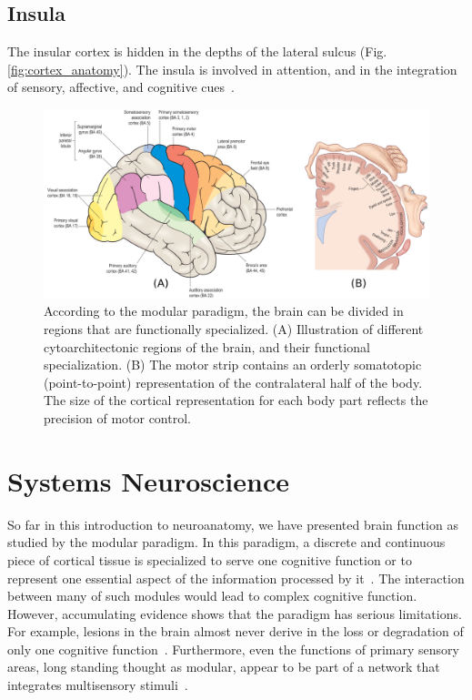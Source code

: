 \subsection{Insula}
The insular cortex is hidden in the depths of the lateral sulcus (Fig.
\ref{fig:cortex_anatomy}). The insula is involved in attention, and in the
integration of sensory, affective, and cognitive cues~\cite{Bressler2010, Johns}.

\begin{figure}[t]
    \includegraphics[width=\textwidth]{2.neuroanatomy/img/function.png}
    \caption{According to the modular paradigm, the brain can be divided in
             regions that are functionally specialized. (A) Illustration of
             different cytoarchitectonic regions of the brain, and their
             functional specialization. (B) The motor strip contains an
             orderly somatotopic (point-to-point) representation of the
             contralateral half of the body. The size of the cortical
             representation for each body part reflects the precision of
             motor control.}
    \label{fig:brain_function}
\end{figure}


\section{Systems Neuroscience}
So far in this introduction to neuroanatomy, we have presented brain function
as studied by the modular paradigm.
In this paradigm, a discrete and continuous piece of cortical tissue is specialized
to serve one cognitive function or to represent one essential aspect of the
information processed by it~\cite{Fuster2000}. The interaction between many
of such modules would lead to complex cognitive function. However, accumulating
evidence shows that the paradigm has serious limitations. For example, lesions
in the brain almost never derive in the loss or degradation of only one cognitive
function~\cite{Fuster2000}. Furthermore, even the functions of primary sensory
areas, long standing thought as modular, appear to be part of a network that
integrates multisensory stimuli~\cite{Ghazanfar2006}.

